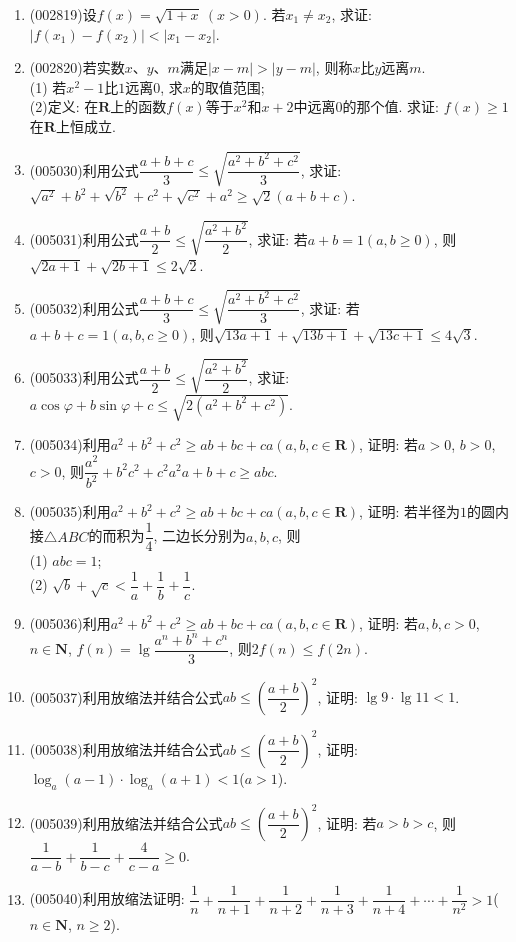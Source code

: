 \documentclass[10pt,a4paper]{article}
\begin{document}
\begin{enumerate}[1.]
\item {\tiny (002819)}设$f(x)=\sqrt{1+x}\ (x>0)$. 若$x_1\ne x_2$, 求证: $|f(x_1)-f(x_2)|<|x_1-x_2|$.
\item {\tiny (002820)}若实数$x$、$y$、$m$满足$|x-m|>|y-m|$, 则称$x$比$y$远离$m$.\\
(1) 若$x^2-1$比$1$远离$0$, 求$x$的取值范围;\\
(2)定义: 在$\mathbf{R}$上的函数$f(x)$等于$x^2$和$x+2$中远离$0$的那个值. 求证: $f(x)\ge 1$在$\mathbf{R}$上恒成立.
\item {\tiny (005030)}利用公式$\dfrac{a+b+c}3\le \sqrt{\dfrac{a^2+b^2+c^2}3}$, 求证: $\sqrt{a^2}+{b^2}+\sqrt{b^2}+{c^2}+\sqrt{c^2}+{a^2}\ge \sqrt 2(a+b+c)$.
\item {\tiny (005031)}利用公式$\dfrac{a+b}2\le \sqrt{\dfrac{a^2+b^2}2}$, 求证: 若$a+b=1(a,b\ge 0)$, 则$\sqrt{2a+1}+\sqrt{2b+1}\le 2\sqrt 2$.
\item {\tiny (005032)}利用公式$\dfrac{a+b+c}3\le \sqrt{\dfrac{a^2+b^2+c^2}3}$, 求证: 若$a+b+c=1(a,b,c\ge 0)$, 则$\sqrt{13a+1}+\sqrt{13b+1}+\sqrt{13c+1}\le 4\sqrt 3$.
\item {\tiny (005033)}利用公式$\dfrac{a+b}2\le \sqrt{\dfrac{a^2+b^2}2}$, 求证: $a\cos \varphi +b\sin \varphi +c\le \sqrt{2(a^2+b^2+c^2)}$.
\item {\tiny (005034)}利用$a^2+b^2+c^2\ge ab+bc+ca(a,b,c\in \mathbf{R})$, 证明: 若$a>0$, $b>0$, $c>0$, 则$\dfrac{a^2}{b^2}+{b^2}{c^2}+{c^2}{a^2}{a+b+c}\ge abc$.
\item {\tiny (005035)}利用$a^2+b^2+c^2\ge ab+bc+ca(a,b,c\in \mathbf{R})$, 证明: 若半径为$1$的圆内接$\triangle ABC$的而积为$\dfrac 14$, 二边长分别为$a,b,c$, 则\\(1) $abc=1$;\\
(2) $\sqrt b+\sqrt c<\dfrac 1a+\dfrac 1b+\dfrac 1c$.
\item {\tiny (005036)}利用$a^2+b^2+c^2\ge ab+bc+ca(a,b,c\in \mathbf{R})$, 证明: 若$a,b,c>0$, $n\in \mathbf{N}$, $f(n)=\lg \dfrac{a^n+b^n+c^n}3$, 则$2f(n)\le f(2n)$.
\item {\tiny (005037)}利用放缩法并结合公式$ab\le (\dfrac{a+b}2)^2$, 证明: $\lg 9\cdot \lg 11<1$.
\item {\tiny (005038)}利用放缩法并结合公式$ab\le (\dfrac{a+b}2)^2$, 证明: $\log_a(a-1)\cdot \log_a(a+1)<1$($a>1$).
\item {\tiny (005039)}利用放缩法并结合公式$ab\le (\dfrac{a+b}2)^2$, 证明: 若$a>b>c$, 则$\dfrac 1{a-b}+\dfrac 1{b-c}+\dfrac 4{c-a}\ge 0$.
\item {\tiny (005040)}利用放缩法证明: $\dfrac 1n+\dfrac 1{n+1}+\dfrac 1{n+2}+\dfrac 1{n+3}+\dfrac 1{n+4}+\cdots +\dfrac 1{n^2}>1$($n\in \mathbf{N}$, $n\ge 2$).

\end{enumerate}
\end{document}
